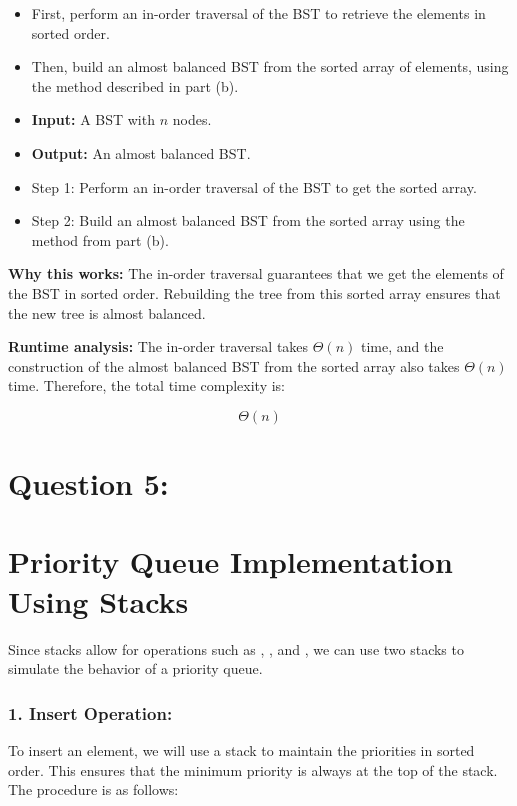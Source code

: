 \documentclass{article}
\begin{document}
\begin{itemize}
    \item First, perform an in-order traversal of the BST to retrieve the elements in sorted order.
    \item Then, build an almost balanced BST from the sorted array of elements, using the method described in part (b).
\end{itemize}

\begin{itemize}
    \item \textbf{Input:} A BST with $n$ nodes.
    \item \textbf{Output:} An almost balanced BST.
    \item Step 1: Perform an in-order traversal of the BST to get the sorted array.
    \item Step 2: Build an almost balanced BST from the sorted array using the method from part (b).
\end{itemize}

\textbf{Why this works:} The in-order traversal guarantees that we get the elements of the BST in sorted order. Rebuilding the tree from this sorted array ensures that the new tree is almost balanced.

\textbf{Runtime analysis:} The in-order traversal takes $\Theta(n)$ time, and the construction of the almost balanced BST from the sorted array also takes $\Theta(n)$ time. Therefore, the total time complexity is:

\[\Theta(n)\]

\pagebreak
\section*{Question 5:}

\section*{Priority Queue Implementation Using Stacks}

Since stacks allow for operations such as , , and , we can use two stacks to simulate the behavior of a priority queue.

\subsubsection*{1. Insert Operation:}

To insert an element, we will use a stack to maintain the priorities in sorted order. This ensures that the minimum priority is always at the top of the stack. The procedure is as follows:
\end{document}
